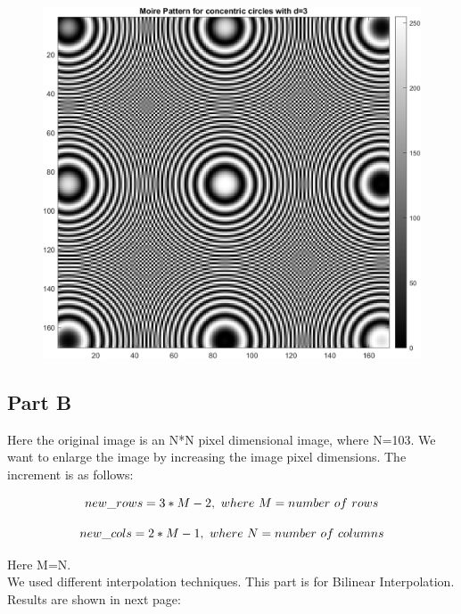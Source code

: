 \documentclass[12pt, a4paper]{article}
\begin{document}
\begin{figure}[h!]
  \centering
    \includegraphics[scale=0.5]{moire3.png}
    \caption{}
  \label{fig:1}
\end{figure}

\subsection*{Part B}
Here the original image is an N*N pixel dimensional image, where N=103. We want to enlarge the image by increasing the image pixel dimensions. The increment is as follows:

\begin{equation*}
    new\_rows=3*M-2,\ where\ M=number\ of\ rows\\
\end{equation*}

\begin{equation*}
    new\_cols=2*M-1,\ where\ N=number\ of\ columns\\
\end{equation*}

Here M=N.\\
We used different interpolation techniques. This part is for Bilinear Interpolation. Results are shown in next page:
\end{document}
